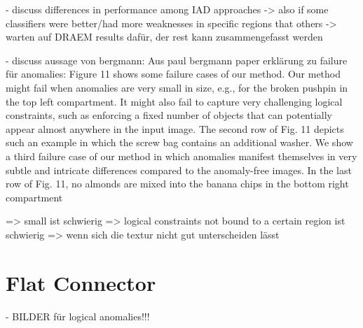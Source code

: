 - discuss differences in performance among IAD approaches\newline
-> also if some classifiers were better/had more weaknesses in specific regions that others\newline
-> warten auf DRAEM results dafür, der rest kann zusammengefasst werden

- discuss aussage von bergmann: 
Aus paul bergmann paper erklärung zu failure für anomalies:
Figure 11 shows some failure cases of our method. Our
method might fail when anomalies are very small in size, e.g.,
for the broken pushpin in the top left compartment. It might
also fail to capture very challenging logical constraints, such
as enforcing a fixed number of objects that can potentially
appear almost anywhere in the input image. The second row
of Fig. 11 depicts such an example in which the screw bag
contains an additional washer. We show a third failure case of
our method in which anomalies manifest themselves in very
subtle and intricate differences compared to the anomaly-free
images. In the last row of Fig. 11, no almonds are mixed into
the banana chips in the bottom right compartment

=> small ist schwierig
=> logical constraints not bound to a certain region ist schwierig
=> wenn sich die textur nicht gut unterscheiden lässt




\section{Flat Connector}
\label{sec:flatconnectordiscussion}

- BILDER für logical anomalies!!!

